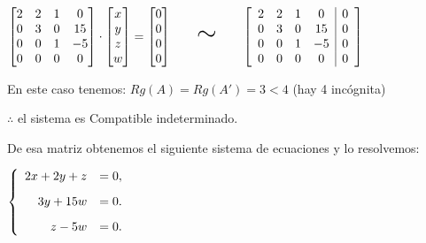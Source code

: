 \documentclass[11pt]{article}
\newcommand{\indicador}[4]{
{\tikz[remember picture,overlay]\coordinate (#1) at #2;}{\tikz[remember picture,overlay]\coordinate (#3) at #4;} 
}
\newcommand{\marka}[2]{
{\tikz[remember picture,overlay]\coordinate (#1) at #2;}
}
\begin{document}
\begin{enumerate}[\hspace{-5mm} 1) ]
\begin{enumerate}
\begin{itemize}
$
    \begin{bmatrix}
    2 & 2 & 1 & 0 \\
0 & 3 & 0 &  15\\
0 & 0 & 1 & -5 \\
0 & 0 & 0 & 0
    \end{bmatrix}
    \cdot
    \begin{bmatrix}
    x \\ y \\ z \\ w 
    \end{bmatrix} =
    \begin{bmatrix}
    0\\ 0 \\ 0 \\ 0
    \end{bmatrix}
\qquad
\text{\huge$\sim$}
\qquad%
\left[
\begin{array}{rrrc|c}
2 & 2 & 1 & 0 & 0\\
0 & 3 & 0 & 15& 0\\
0 & 0 & 1 & -5 & 0\\
0 & 0 & 0 & 0 & 0
\end{array}
\right] 
$

En este caso tenemos: $Rg(A) =  Rg(A') = 3 < 4$  (hay 4 incógnita) 
    
 \medskip 
 
    \hfill $\therefore$ el sistema es Compatible indeterminado.
    


De esa matriz obtenemos el siguiente sistema de ecuaciones y lo resolvemos:

\bigskip
$
\left\{
\begin{array}{rl}
2 x +2 y + z  &= 0, \marka{xx}{(.1,.15)}\\[3mm]
3y +15 w &= 0 . \indicador{a}{(.1,.15)}{b}{(.9,.15)}\\[3mm]
z -5 w  &=0 . \indicador{A}{(.1,.15)}{B}{(.9,.15)}
\end{array}
\right.
$

 



\end{itemize}
\end{enumerate}
\end{enumerate}
\end{document}

